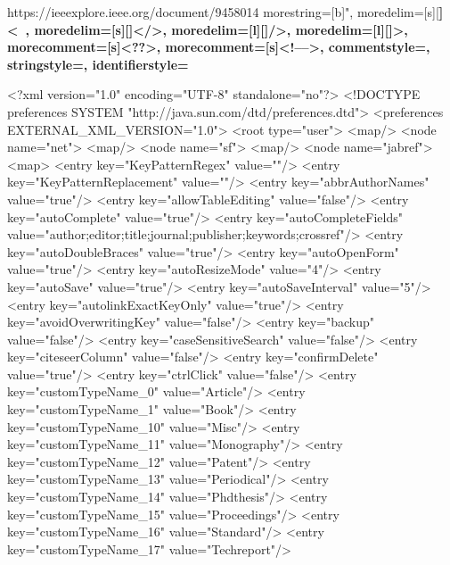 https://ieeexplore.ieee.org/document/9458014
{
  morestring=[b]",
  moredelim=[s][\bfseries\color{maroon}]{<}{\ },
  moredelim=[s][\bfseries\color{maroon}]{</}{>},
  moredelim=[l][\bfseries\color{maroon}]{/>},
  moredelim=[l][\bfseries\color{maroon}]{>},
  morecomment=[s]{<?}{?>},
  morecomment=[s]{<!--}{-->},
  commentstyle=\color{darkgreen},
  stringstyle=\color{blue},
  identifierstyle=\color{red}
}


\begin{codigo}[caption={Código de configuração do programa JabRef em XML}, label={codigo:config-jabref}, language=XML, breaklines=true]
<?xml version="1.0" encoding="UTF-8" standalone="no"?>
<!DOCTYPE preferences SYSTEM "http://java.sun.com/dtd/preferences.dtd">
<preferences EXTERNAL_XML_VERSION="1.0">
  <root type="user">
    <map/>
    <node name="net">
      <map/>
      <node name="sf">
        <map/>
        <node name="jabref">
          <map>
            <entry key="KeyPatternRegex" value=""/>
            <entry key="KeyPatternReplacement" value=""/>
            <entry key="abbrAuthorNames" value="true"/>
            <entry key="allowTableEditing" value="false"/>
            <entry key="autoComplete" value="true"/>
            <entry key="autoCompleteFields" value="author;editor;title;journal;publisher;keywords;crossref"/>
            <entry key="autoDoubleBraces" value="true"/>
            <entry key="autoOpenForm" value="true"/>
            <entry key="autoResizeMode" value="4"/>
            <entry key="autoSave" value="true"/>
            <entry key="autoSaveInterval" value="5"/>
            <entry key="autolinkExactKeyOnly" value="true"/>
            <entry key="avoidOverwritingKey" value="false"/>
            <entry key="backup" value="false"/>
            <entry key="caseSensitiveSearch" value="false"/>
            <entry key="citeseerColumn" value="false"/>
            <entry key="confirmDelete" value="true"/>
            <entry key="ctrlClick" value="false"/>
            <entry key="customTypeName_0" value="Article"/>
            <entry key="customTypeName_1" value="Book"/>
            <entry key="customTypeName_10" value="Misc"/>
            <entry key="customTypeName_11" value="Monography"/>
            <entry key="customTypeName_12" value="Patent"/>
            <entry key="customTypeName_13" value="Periodical"/>
            <entry key="customTypeName_14" value="Phdthesis"/>
            <entry key="customTypeName_15" value="Proceedings"/>
            <entry key="customTypeName_16" value="Standard"/>
            <entry key="customTypeName_17" value="Techreport"/>

\end{codigo}
